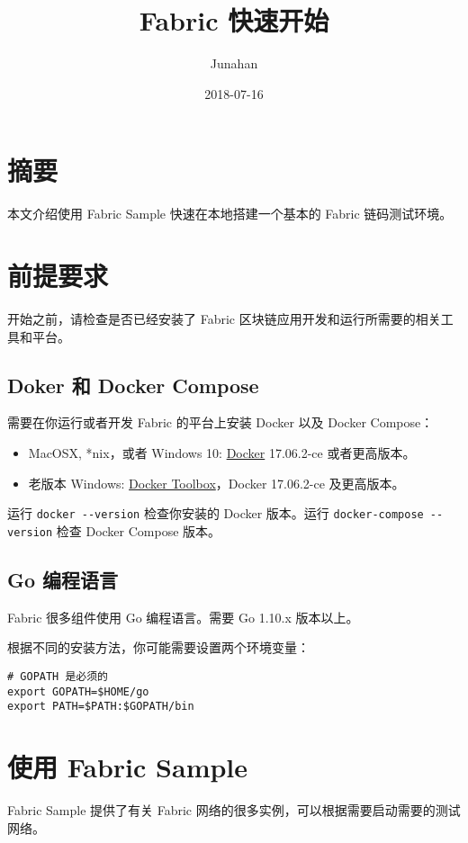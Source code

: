 \documentclass[11pt]{article}
\author{Junahan}
\date{2018-07-16}
\title{Fabric 快速开始}
\begin{document}
\maketitle
\tableofcontents


\section{摘要}
\label{sec-1}
本文介绍使用 Fabric Sample 快速在本地搭建一个基本的 Fabric 链码测试环境。

\section{前提要求}
\label{sec-2}
开始之前，请检查是否已经安装了 Fabric 区块链应用开发和运行所需要的相关工具和平台。

\subsection{Doker 和 Docker Compose}
\label{sec-2-1}
需要在你运行或者开发 Fabric 的平台上安装 Docker 以及 Docker Compose：
\begin{itemize}
\item MacOSX, *nix，或者 Windows 10: \href{https://www.docker.com/get-docker}{Docker} 17.06.2-ce 或者更高版本。
\item 老版本 Windows: \href{https://docs.docker.com/toolbox/toolbox_install_windows/}{Docker Toolbox}，Docker 17.06.2-ce 及更高版本。
\end{itemize}

运行 \texttt{docker -{}-version} 检查你安装的 Docker 版本。运行 \texttt{docker-compose -{}-version} 检查 Docker Compose 版本。

\subsection{Go 编程语言}
\label{sec-2-2}
Fabric 很多组件使用 Go 编程语言。需要 Go 1.10.x 版本以上。

根据不同的安装方法，你可能需要设置两个环境变量：
\begin{verbatim}
# GOPATH 是必须的
export GOPATH=$HOME/go
export PATH=$PATH:$GOPATH/bin
\end{verbatim}

\section{使用 Fabric Sample}
\label{sec-3}
Fabric Sample 提供了有关 Fabric 网络的很多实例，可以根据需要启动需要的测试网络。
\end{document}
